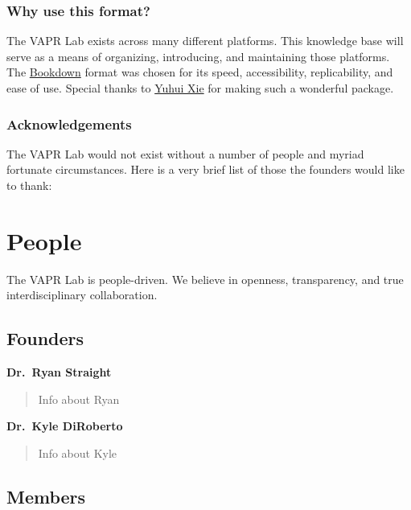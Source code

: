 \documentclass[
  12pt,
]{memoir}
\begin{document}
\hypertarget{why-use-this-format}{%
\subsection*{Why use this format?}\label{why-use-this-format}}

The VAPR Lab exists across many different platforms. This knowledge base will serve as a means of organizing, introducing, and maintaining those platforms. The \href{https://bookdown.org}{Bookdown} format was chosen for its speed, accessibility, replicability, and ease of use. Special thanks to \href{https://yihui.name/}{Yuhui Xie} for making such a wonderful package.

\hypertarget{acknowledgements}{%
\subsection*{Acknowledgements}\label{acknowledgements}}

The VAPR Lab would not exist without a number of people and myriad fortunate circumstances. Here is a very brief list of those the founders would like to thank:

\hypertarget{people}{%
\chapter{People}\label{people}}

The VAPR Lab is people-driven. We believe in openness, transparency, and true interdisciplinary collaboration.

\hypertarget{founders}{%
\section{Founders}\label{founders}}

\textbf{Dr.~Ryan Straight}

\begin{quote}
Info about Ryan
\end{quote}

\textbf{Dr.~Kyle DiRoberto}

\begin{quote}
Info about Kyle
\end{quote}

\hypertarget{members}{%
\section{Members}\label{members}}
\end{document}
